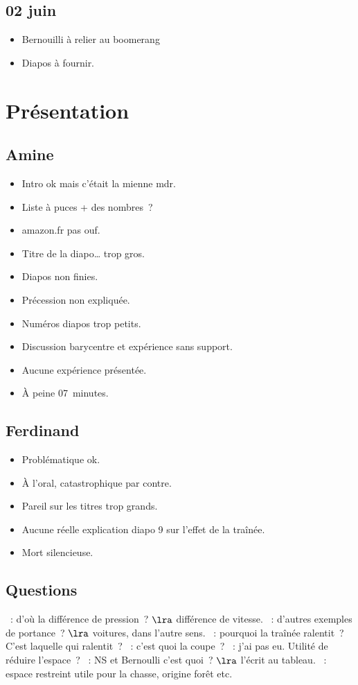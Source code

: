 \documentclass[a4paper, 11pt, final, garamond]{book}
\begin{document}
\subsection{02 juin}
\begin{itemize}
  \item Bernouilli à relier au boomerang
  \item Diapos à fournir.
\end{itemize}

\section{Présentation}
\subsection{Amine}
\begin{itemize}
  \item Intro ok mais c'était la mienne mdr.
  \item Liste à puces + des nombres~?
  \item amazon.fr pas ouf.
  \item Titre de la diapo… trop gros.
  \item Diapos non finies.
  \item Précession non expliquée.
  \item Numéros diapos trop petits.
  \item Discussion barycentre et expérience sans support.
  \item Aucune expérience présentée.
  \item À peine \SI{07}{minutes}.
\end{itemize}

\subsection{Ferdinand}
\begin{itemize}
   stressé.
  \item Problématique ok.
  \item À l'oral, catastrophique par contre.
  \item Pareil sur les titres trop grands.
  \item Aucune réelle explication diapo 9 sur l'effet de la traînée.
  \item Mort silencieuse.
\end{itemize}

\subsection{Questions}
\begin{itemize}
  ~: d'où la différence de pression~?
    $\lra$ différence de vitesse.
  ~: d'autres exemples de portance~?
    $\lra$ voitures, dans l'autre sens.
  ~: pourquoi la traînée ralentit~? C'est laquelle qui ralentit~?
  ~: c'est quoi la coupe~?
  ~: j'ai pas eu. Utilité de réduire l'espace~?
  ~: NS et Bernoulli c'est quoi~?
    $\lra$ l'écrit au tableau.
  ~: espace restreint utile pour la chasse, origine forêt etc.
\end{itemize}
\end{document}
